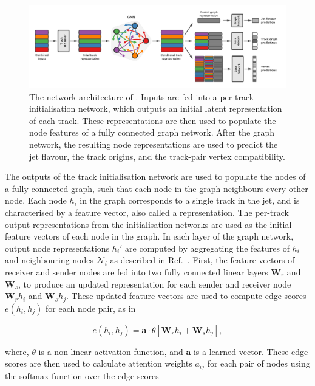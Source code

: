 \begin{figure}[!htbp]
    \centering
    \includegraphics[width=\textwidth]{chapters/gnn_tagger/figs/full_arch.pdf}
    \caption{The network architecture of \GNN. Inputs are fed into a per-track initialisation network, which outputs an initial latent representation of each track. These representations are then used to populate the node features of a fully connected graph network. After the graph network, the resulting node representations are used to predict the jet flavour, the track origins, and the track-pair vertex compatibility.}
    \label{fig:new_arch}
\end{figure}

The outputs of the track initialisation network are used to populate the nodes of a fully connected graph, such that each node in the graph neighbours every other node.
Each node $h_i$ in the graph corresponds to a single track in the jet, and is characterised by a feature vector, also called a representation.
The per-track output representations from the initialisation networks are used as the initial feature vectors of each node in the graph.
In each layer of the graph network, output node representations $h_i'$ are computed by aggregating the features of $h_i$ and neighbouring nodes $\mathcal{N}_i$ as described in Ref.~\cite{2021arXiv210514491B}.
First, the feature vectors of  receiver and sender nodes are fed into two fully connected linear layers $\mathbf{W}_r$ and $\mathbf{W}_s$, to produce an updated representation for each sender and receiver node $\mathbf{W}_r h_i$ and $\mathbf{W}_s h_j$.
These updated feature vectors are used to compute edge scores $e(h_i, h_j)$ for each node pair, as in

\begin{equation}\label{eq:edge_score}
    e(h_i, h_j) = \mathbf{a} \cdot \theta \left[ \mathbf{W}_r h_i + \mathbf{W}_s h_j \right],
\end{equation}

where, $\theta$ is a non-linear activation function, and $\mathbf{a}$ is a learned vector.
These edge scores are then used to calculate attention weights $a_{ij}$ for each pair of nodes using the softmax function over the edge scores

